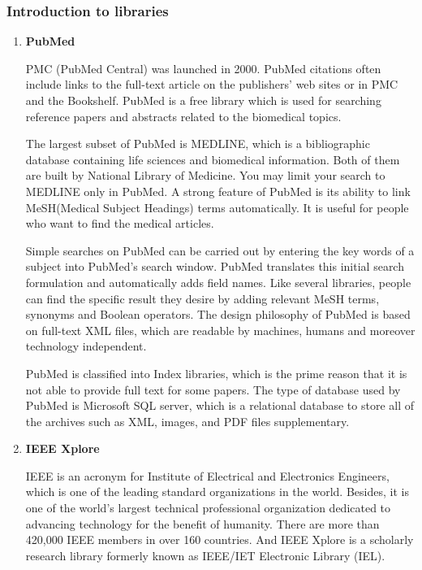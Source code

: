\subsubsection{Introduction to libraries }

\begin{enumerate}
	
	\item\textbf{PubMed}
	\setlength{\parindent}{1em}
	
	 PMC (PubMed Central) was launched in 2000.
	 PubMed citations often include links to the full-text article on the publishers' web sites or in PMC and the Bookshelf.
	 PubMed is a free library which is used for searching reference papers and abstracts related to the biomedical topics.
	 
	 The largest subset of PubMed is MEDLINE, which is a bibliographic database containing life sciences and biomedical information.
	 Both of them are built by National Library of Medicine. You may limit your search to MEDLINE only in PubMed.
	 A strong feature of PubMed is its ability to link MeSH(Medical Subject Headings) terms automatically. 
	 It is useful for people who want to find the medical articles.
	  
     Simple searches on PubMed can be carried out by entering the key words of a subject into PubMed's search window.
     PubMed translates this initial search formulation and automatically adds field names.
	 Like several libraries, people can find the specific result they desire by adding relevant MeSH terms, synonyms and Boolean operators.	 
	 The design philosophy of PubMed is based on full-text XML files, which are readable by machines, humans and moreover technology independent.
	 
	 PubMed is classified into Index libraries, which is the prime reason that it is not able to provide full text for some papers.
	 The type of database used by PubMed is Microsoft SQL server, which is a relational database to store all of the archives such as XML, images, and PDF files supplementary.
	
	\item\textbf{IEEE Xplore}
	\setlength{\parindent}{1em}	
	
	IEEE is an acronym for Institute of Electrical and Electronics Engineers, which is one of the leading standard organizations in the world. 
	Besides, it is one of the world's largest technical professional organization dedicated to advancing technology for the benefit of humanity. 
	There are more than 420,000 IEEE members in over 160 countries.
	And IEEE Xplore is a scholarly research library formerly known as IEEE/IET Electronic Library (IEL).
	

\end{enumerate}
